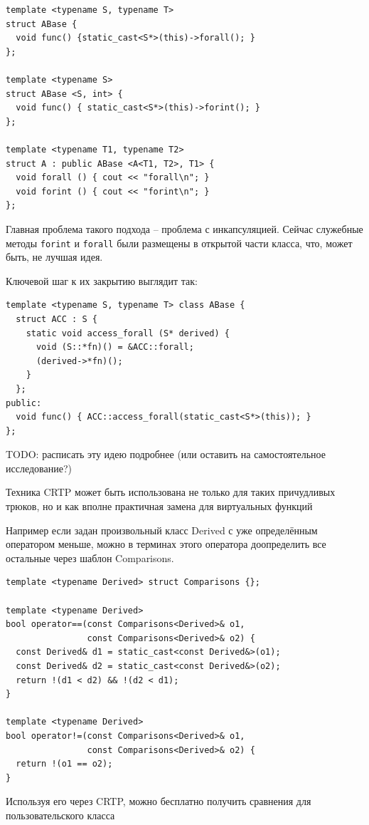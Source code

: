 \documentclass[a4paper,12pt,oneside]{book}
\begin{document}
\begin{lstlisting}
template <typename S, typename T>
struct ABase {
  void func() {static_cast<S*>(this)->forall(); }
};

template <typename S>
struct ABase <S, int> {
  void func() { static_cast<S*>(this)->forint(); }
};

template <typename T1, typename T2>
struct A : public ABase <A<T1, T2>, T1> {
  void forall () { cout << "forall\n"; }
  void forint () { cout << "forint\n"; }
};
\end{lstlisting}

Главная проблема такого подхода -- проблема с инкапсуляцией. Сейчас служебные методы \lstinline!forint! и \lstinline!forall! были размещены в открытой части класса, что, может быть, не лучшая идея.

Ключевой шаг к их закрытию выглядит так:

\begin{lstlisting}
template <typename S, typename T> class ABase {
  struct ACC : S { 
    static void access_forall (S* derived) { 
      void (S::*fn)() = &ACC::forall;
      (derived->*fn)(); 
    }
  };
public:
  void func() { ACC::access_forall(static_cast<S*>(this)); }
};
\end{lstlisting}

TODO: расписать эту идею подробнее (или оставить на самостоятельное исследование?)

Техника CRTP может быть использована не только для таких причудливых трюков, но и как вполне практичная замена для виртуальных функций

Например если задан произвольный класс Derived с уже определённым оператором меньше, можно в терминах этого оператора доопределить все остальные через шаблон Comparisons. 

\begin{lstlisting}
template <typename Derived> struct Comparisons {};

template <typename Derived>
bool operator==(const Comparisons<Derived>& o1, 
                const Comparisons<Derived>& o2) {
  const Derived& d1 = static_cast<const Derived&>(o1);
  const Derived& d2 = static_cast<const Derived&>(o2);
  return !(d1 < d2) && !(d2 < d1);
}

template <typename Derived>
bool operator!=(const Comparisons<Derived>& o1, 
                const Comparisons<Derived>& o2) {
  return !(o1 == o2);
}
\end{lstlisting}

Используя его через CRTP, можно бесплатно получить сравнения для пользовательского класса
\end{document}
